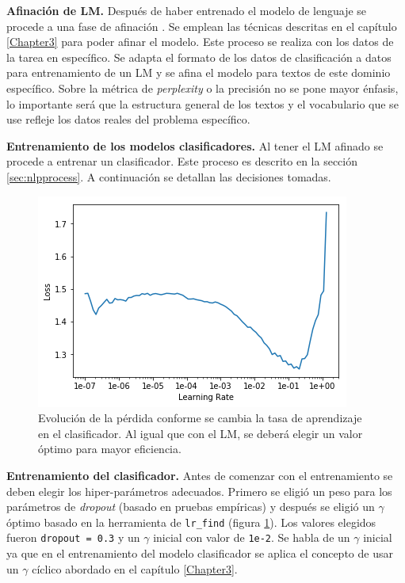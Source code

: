 \textbf{Afinación de LM.} Después de haber entrenado el modelo de lenguaje se procede a una fase de afinación \parencite{howard2018}. Se emplean las técnicas descritas en el capítulo \ref{Chapter3} para poder afinar el modelo. Este proceso se realiza con los datos de la tarea en específico. Se adapta el formato de los datos de clasificación a datos para entrenamiento de un LM y se afina el modelo para textos de este dominio específico. Sobre la métrica de \textit{perplexity} o la precisión no se pone mayor énfasis, lo importante será que la estructura general de los textos y el vocabulario que se use refleje los datos reales del problema específico.

\textbf{Entrenamiento de los modelos clasificadores.} Al tener el LM afinado se procede a entrenar un clasificador. Este proceso es descrito en la sección \ref{sec:nlpprocess}. A continuación se detallan las decisiones tomadas.

\begin{figure}
\centering
\includegraphics[scale=1]{Figures/clas_lrfinder.png}
\caption{Evolución de la pérdida conforme se cambia la tasa de aprendizaje en el clasificador. Al igual que con el LM, se deberá elegir un valor óptimo para mayor eficiencia.}
\label{fig:claslr}
\end{figure}

\textbf{Entrenamiento del clasificador.} Antes de comenzar con el entrenamiento se deben elegir los hiper-parámetros adecuados. Primero se eligió un peso para los parámetros de \textit{dropout} (basado en pruebas empíricas) y después se eligió un $\gamma$ óptimo basado en la herramienta de \texttt{lr\_find} (figura \ref{fig:claslr}). Los valores elegidos fueron \texttt{dropout = 0.3} y un $\gamma$ inicial con valor de \texttt{1e-2}. Se habla de un $\gamma$ inicial ya que en el entrenamiento del modelo clasificador se aplica el concepto de usar un $\gamma$ cíclico \parencite{smith2017convergence} abordado en el capítulo \ref{Chapter3}.

